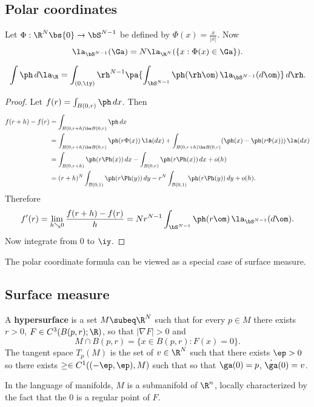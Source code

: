 
\subsection{Polar coordinates}
Let $\Phi:\R^N\bs \{0\}\to \bS^{N-1}$ be defined by $\Phi(x)=\frac{x}{|x|}$. Now
\[
\la_{\bS^{N-1}}(\Ga)=N\la_{\R^N}(\{x:\Phi(x)\in \Ga\}).
\]
\begin{thm}
\[
\int \ph \,d\la_{\R} = \int_{(0,\iy)} \rh^{N-1} \pa{\int_{\bS^{N-1}}\ph(\rh \om)\,\la_{\bS^{N-1}}(d\om)}\,d\rh.
\]
\end{thm}
\begin{proof}
Let $f(r)=\int_{B(0,r)} \ph \,dx$. Then
\begin{align*}
f(r+h)-f(r)&=\int_{B(0,r+h)\bs B(0,r)} \ph\, dx\\
&=\int_{B(0,r+h)\bs B(0,r)}\ph(r\Phi(x))\,\la(dx)
+%
\int_{B(0,r+h)\bs B(0,r)}(\ph(x)-\ph(r\Phi(x)))\,\la(dx)%
\\
&=\int_{B(0,r+h)}\ph(r\Ph(x))\,dx-\int_{B(0,r)}\ph(r\Ph(x))\,dx+o(h)\\
&=(r+h)^N\int_{B(0,1)} \ph(r\Ph(y))\,dy-r^N\int_{B(0,1)}\ph(r\Ph(y))\,dy+o(h).
\end{align*}
Therefore 
\[
f'(r)=\lim_{h\searrow 0}\frac{f(r+h)-f(r)}{h}=Nr^{N-1}\int_{\bS^{N-1}}\ph(r\om) \,\la_{\bS^{N-1}}(d\om).
\]
Now integrate from 0 to $\iy$.
\end{proof}

The polar coordinate formula can be viewed as a special case of surface measure.
\subsection{Surface measure}
\begin{df}
A \textbf{hypersurface} is a set $M\subeq \R^N$ such that for every $p\in M$ there exists $r>0$, $F\in C^3(B(p,r); \R)$, so that $|\nabla F|>0$ and 
\[M\cap B(p,r)=\{x\in B(p,r):F(x)=0\}.\]
The tangent space $T_p(M)$  is the set of $v\in \R^N$ such that there exists $\ep>0$ so there exists $\ge\in C^1((-\ep,\ep),M
)$ such that so that $\ga(0)=p$, $\dot{\ga}(0)=v$. 
\end{df}
In the language of manifolds, $M$ is a submanifold of $\R^n$, locally characterized by the fact that the 0 is a regular point of $F$.

